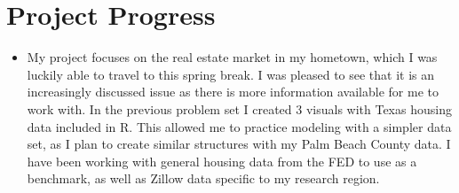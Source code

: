 \documentclass{article}
\begin{document}
\section{Project Progress}
\begin{itemize}
\item My project focuses on the real estate market in my hometown, which I was luckily able to travel to this spring break. I was pleased to see that it is an increasingly discussed issue as there is more information available for me to work with. In the previous problem set I created 3 visuals with Texas housing data included in R. This allowed me to practice modeling with a simpler data set, as I plan to create similar structures with my Palm Beach County data. I have been working with general housing data from the FED to use as a benchmark, as well as Zillow data specific to my research region. 
\end{itemize}
\end{document}
